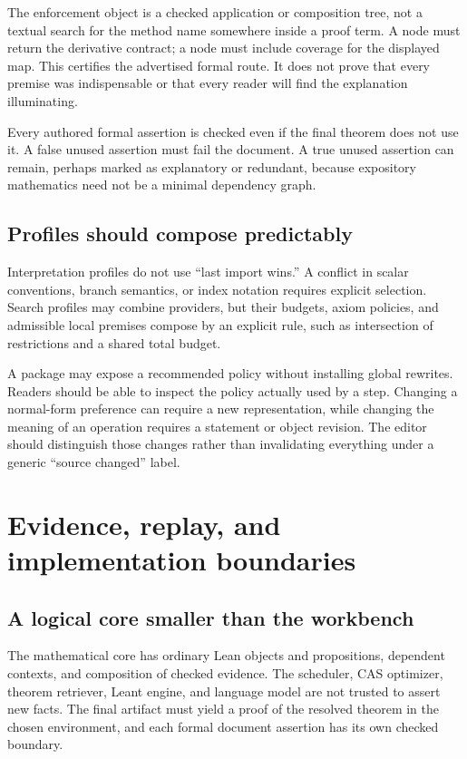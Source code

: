 \documentclass[11pt,a4paper]{article}
\newcommand{\code}[1]{\texttt{\detokenize{#1}}}
\theoremstyle{definition}
\theoremstyle{remark}
\begin{document}
The enforcement object is a checked application or composition tree, not a textual search for the method name somewhere inside a proof term. A \code{differentiate} node must return the derivative contract; a \code{reindex} node must include coverage for the displayed map. This certifies the advertised formal route. It does not prove that every premise was indispensable or that every reader will find the explanation illuminating.

Every authored formal assertion is checked even if the final theorem does not use it. A false unused assertion must fail the document. A true unused assertion can remain, perhaps marked as explanatory or redundant, because expository mathematics need not be a minimal dependency graph.

\subsection{Profiles should compose predictably}
Interpretation profiles do not use ``last import wins.'' A conflict in scalar conventions, branch semantics, or index notation requires explicit selection. Search profiles may combine providers, but their budgets, axiom policies, and admissible local premises compose by an explicit rule, such as intersection of restrictions and a shared total budget.

A package may expose a recommended policy without installing global rewrites. Readers should be able to inspect the policy actually used by a step. Changing a normal-form preference can require a new representation, while changing the meaning of an operation requires a statement or object revision. The editor should distinguish those changes rather than invalidating everything under a generic ``source changed'' label.

\section{Evidence, replay, and implementation boundaries}\label{sec:replay}
\subsection{A logical core smaller than the workbench}
The mathematical core has ordinary Lean objects and propositions, dependent contexts, and composition of checked evidence. The scheduler, CAS optimizer, theorem retriever, Leant engine, and language model are not trusted to assert new facts. The final artifact must yield a proof of the resolved theorem in the chosen environment, and each formal document assertion has its own checked boundary.
\end{document}
